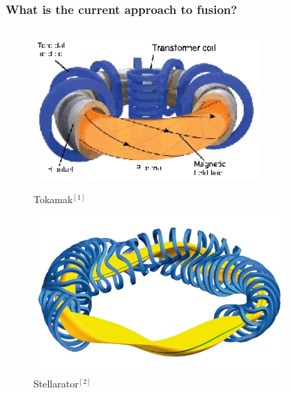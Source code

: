 \documentclass{beamer}
\begin{document}
\begin{frame}
\frametitle{What is the current approach to fusion?}
\vspace{-1.8 cm}
\begin{columns}[onlytextwidth]
	\begin{column}{0.45\textwidth}
		\begin{center}
		\begin{figure}
			\includegraphics[trim={0 0 0 0cm},clip,width=0.8\textwidth]{FIGURES/Schematic-of-a-Tokamak-fusion-reactor-Source-Fusion-for-energy.eps}
	\vspace{-0.2cm}	\caption{Tokamak$^{[1]}$}
					\includegraphics[trim={0 0 0 0cm},clip,width=0.9\textwidth]{FIGURES/W7X-Spulen_Plasma_blau_gelb.jpg}
	\vspace{-0.4cm}	\caption{Stellarator$^{[2]}$}
		\end{figure}
		\end{center}
	\end{column}
	\begin{column}{0.45\textwidth}
		\vspace{0 cm}
		\begin{center}
			\begin{itemize}

\end{itemize}
\end{center}
\end{column}
\end{columns}
\end{frame}
\end{document}
